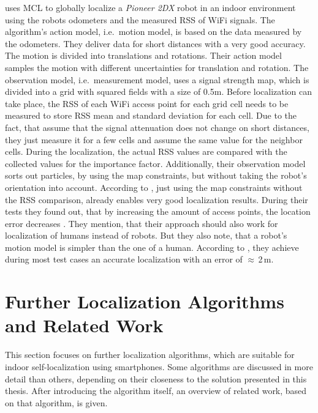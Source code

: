 \citet{siddiqi:experiments_mcl_wifi} uses \ac{MCL} to globally localize a \emph{Pioneer 2DX} robot in an indoor environment using the robots odometers and the measured \ac{RSS} of WiFi signals. The algorithm's action model, i.e.\ motion model, is based on the data measured by the odometers. They deliver data for short distances with a very good accuracy. The motion is divided into translations and rotations. Their action model samples the motion with different uncertainties for translation and rotation. The observation model, i.e.\ measurement model, uses a signal strength map, which is divided into a grid with squared fields with a size of 0.5m. Before localization can take place, the \ac{RSS} of each WiFi access point for each grid cell needs to be measured to store \ac{RSS} mean and standard deviation for each cell. Due to the fact, that \citet{siddiqi:experiments_mcl_wifi} assume that the signal attenuation does not change on short distances, they just measure it for a few cells and assume the same value for the neighbor cells. During the localization, the actual \ac{RSS} values are compared with the collected values for the importance factor. Additionally, their observation model sorts out particles, by using the map constraints, but without taking the robot's orientation into account. According to \citet{siddiqi:experiments_mcl_wifi}, just using the map constraints without the \ac{RSS} comparison, already enables very good localization results.
During their tests they found out, that by increasing the amount of access points, the location error decreases \citep{siddiqi:experiments_mcl_wifi}. They mention, that their approach should also work for localization of humans instead of robots. But they also note, that a robot's motion model is simpler than the one of a human. According to \citet{siddiqi:experiments_mcl_wifi}, they achieve during most test cases an accurate localization with an error of $\approx$\,2\,m.


\section{Further Localization Algorithms and Related Work}
This section focuses on further localization algorithms, which are suitable for indoor self-localization using smartphones. Some algorithms are discussed in more detail than others, depending on their closeness to the solution presented in this thesis. After introducing the algorithm itself, an overview of related work, based on that algorithm, is given.

